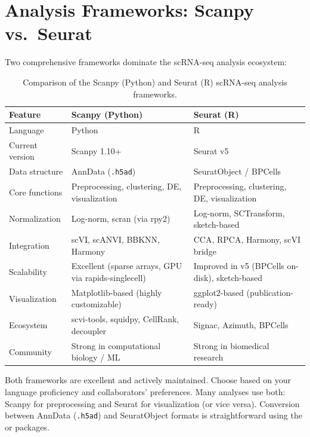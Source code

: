 \section{Analysis Frameworks: Scanpy vs.\ Seurat}
\label{sec:scrnaseq:frameworks}

Two comprehensive frameworks dominate the scRNA-seq analysis ecosystem:

\begin{table}[htbp]
\centering
\caption{Comparison of the Scanpy (Python) and Seurat (R) scRNA-seq analysis
frameworks.}
\label{tab:scrnaseq:frameworks}
\small
\begin{tabularx}{\textwidth}{lXX}
\toprule
\textbf{Feature} & \textbf{Scanpy (Python)} & \textbf{Seurat (R)} \\
\midrule
Language & Python & R \\
Current version & Scanpy 1.10+ & Seurat v5 \\
Data structure & AnnData (\texttt{.h5ad}) & SeuratObject / BPCells \\
Core functions & Preprocessing, clustering, DE, visualization & Preprocessing, clustering, DE, visualization \\
Normalization & Log-norm, scran (via rpy2) & Log-norm, SCTransform, sketch-based \\
Integration & scVI, scANVI, BBKNN, Harmony & CCA, RPCA, Harmony, scVI bridge \\
Scalability & Excellent (sparse arrays, GPU via rapids-singlecell) & Improved in v5 (BPCells on-disk), sketch-based \\
Visualization & Matplotlib-based (highly customizable) & ggplot2-based (publication-ready) \\
Ecosystem & scvi-tools, squidpy, CellRank, decoupler & Signac, Azimuth, BPCells \\
Community & Strong in computational biology / ML & Strong in biomedical research \\
\bottomrule
\end{tabularx}
\end{table}

\begin{tipbox}
Both frameworks are excellent and actively maintained. Choose based on your
language proficiency and collaborators' preferences. Many analyses use both:
Scanpy for preprocessing and Seurat for visualization (or vice versa).
Conversion between AnnData (\texttt{.h5ad}) and SeuratObject formats is
straightforward using the  or 
packages.
\end{tipbox}


